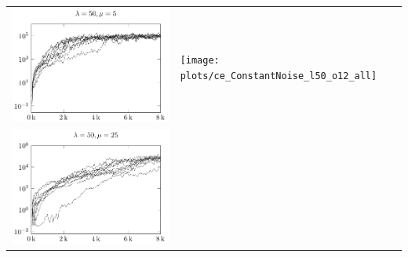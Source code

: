 \begin{tabular}{@{}l@{}l@{}}
\includegraphics[scale=1]{plots/ce_ConstantNoise_l50_o5_all} &
\texttt{[image: plots/ce\_ConstantNoise\_l50\_o12\_all]} \\
\includegraphics[scale=1]{plots/ce_ConstantNoise_l50_o25_all}
\end{tabular}


